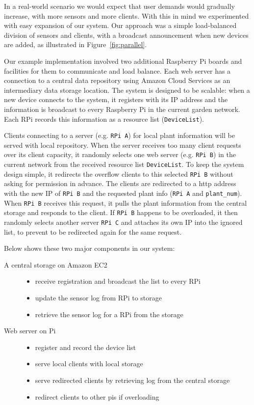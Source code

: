 \documentclass[a4paper]{acm_proc_article-sp}
\begin{document}
In a real-world scenario we would expect that user demands would gradually increase, with more sensors and more clients.  With this in mind we experimented with easy expansion of our system.  Our approach was a simple load-balanced division of sensors and clients, with a broadcast announcement when new devices are added, as illustrated in Figure~\ref{fig:parallel}.

Our example implementation involved two additional Raspberry Pi boards and facilities for them to communicate and load balance. Each web server has a connection to a central data repository using Amazon Cloud Services as an intermediary data storage location. The system is designed to be scalable: when a new device connects to the system, it registers with its IP address and the information is broadcast to every Raspberry Pi in the current garden network. Each RPi records this information as a resource list (\lstinline|DeviceList|).

Clients connecting to a server (e.g. \lstinline|RPi A|) for local plant information will be served with local repository. When the server receives too many client requests over its client capacity, it randomly selects one web server (e.g. \lstinline|RPi B|) in the current network from the received resource list \lstinline|DeviceList|. To keep the system design simple, it redirects the overflow clients to this selected \lstinline|RPi B| without asking for permission in advance. The clients are redirected to a http address with the new IP of \lstinline|RPi B| and the requested plant info (\lstinline|RPi A| and \lstinline|plant_num|). When \lstinline|RPi B| receives this  request, it pulls the plant information from the central storage and responds to the client. If \lstinline|RPi B| happens to be overloaded, it then randomly selects another server \lstinline|RPi C| and attaches its own IP into the ignored list, to prevent to be redirected again for the same request.

Below shows these two major components in our system:
\begin{description}
  \item[A central storage on Amazon EC2 ] \hfill
  \begin{itemize}
    \item receive registration and broadcast the list to every RPi
    \item update the sensor log from RPi to storage
    \item retrieve the sensor log for a RPi from the storage
  \end{itemize}
  \item[Web server on Pi] \hfill
  \begin{itemize}
    \item register and record the device list
    \item serve local clients with local storage
    \item serve redirected clients by retrieving log from the central storage
    \item redirect clients to other pis if overloading
  \end{itemize}
\end{description}
\end{document}
